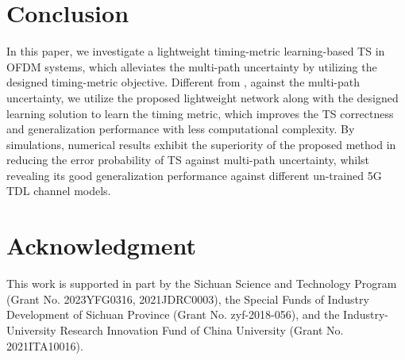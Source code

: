 \documentclass[conference]{IEEEtran}
\begin{document}
\section{Conclusion}\label{S:V}
In this paper, we investigate a lightweight timing-metric learning-based TS in OFDM systems, which alleviates the multi-path uncertainty by utilizing the designed timing-metric objective.
Different from \cite{ref:JSandCE,ref:CNNPD,ref:ELM-FTS,ref:ELM-labelTS}, against the multi-path uncertainty, we utilize the proposed lightweight network along with the designed learning solution to learn the timing metric, which improves the TS correctness and generalization performance with less computational complexity.
By simulations, numerical results exhibit the superiority of the proposed method in reducing the error probability of TS against multi-path uncertainty, whilst revealing its good generalization performance against different un-trained 5G TDL channel models.
\section{Acknowledgment}
This work is supported in part by the Sichuan Science and Technology Program (Grant No. 2023YFG0316, 2021JDRC0003), the Special Funds of Industry Development of Sichuan Province (Grant No. zyf-2018-056), and the Industry-University Research Innovation Fund of China University (Grant No. 2021ITA10016).
\end{document}
